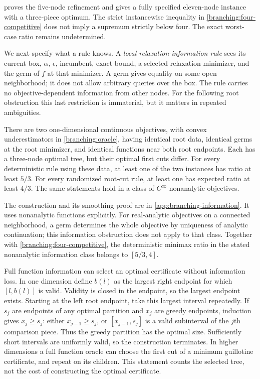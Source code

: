  proves the five-node refinement
and gives a fully specified eleven-node instance with a three-piece
optimum. The strict instancewise inequality in
\cref{branching:four-competitive} does not imply a supremum strictly
below four. The exact worst-case ratio remains undetermined.

We next specify what a rule knows. A \emph{local relaxation-information
rule} sees its current box, $\alpha$, $\epsilon$, incumbent, exact bound,
a selected relaxation minimizer, and the germ of $f$ at that minimizer.
A germ gives equality on some open neighborhood; it does not allow
arbitrary queries over the box. The rule carries no objective-dependent
information from other nodes. For the following root obstruction this
last restriction is immaterial, but it matters in repeated ambiguities.

\begin{proposition}
\label{branching:germ-obstruction}
There are two one-dimensional continuous objectives, with convex
underestimators in \eqref{branching:oracle}, having identical root data,
identical germs at the root minimizer, and identical functions near both
root endpoints. Each has a three-node optimal tree, but their optimal
first cuts differ. For every deterministic rule using these data, at
least one of the two instances has ratio at least $5/3$. For every
randomized root-cut rule, at least one has expected ratio at least $4/3$.
The same statements hold in a class of $C^\infty$ nonanalytic objectives.
\end{proposition}

The construction and its smoothing proof are in
\cref{app:branching-information}. It uses nonanalytic functions explicitly.
For real-analytic objectives on a connected neighborhood, a germ determines
the whole objective by uniqueness of analytic continuation; this
information obstruction does not apply to that class. Together with
\cref{branching:four-competitive}, the deterministic minimax ratio in
the stated nonanalytic information class belongs to $[5/3,4]$.

Full function information can select an optimal certificate without
information loss. In one dimension define $b(l)$ as the largest right
endpoint for which $[l,b(l)]$ is valid. Validity is closed in the endpoint,
so the largest endpoint exists. Starting at the left root endpoint,
take this largest interval repeatedly. If $s_j$ are endpoints of any
optimal partition and $x_j$ are greedy endpoints, induction gives
$x_j\ge s_j$: either $x_{j-1}\ge s_j$, or
$[x_{j-1},s_j]$ is a valid subinterval of the $j$th comparison piece.
Thus the greedy partition has the optimal size. Sufficiently short
intervals are uniformly valid, so the construction terminates.
In higher dimensions a full function oracle can choose the first cut
of a minimum guillotine certificate, and repeat on its children. This
statement counts the selected tree, not the cost of constructing the
optimal certificate.

